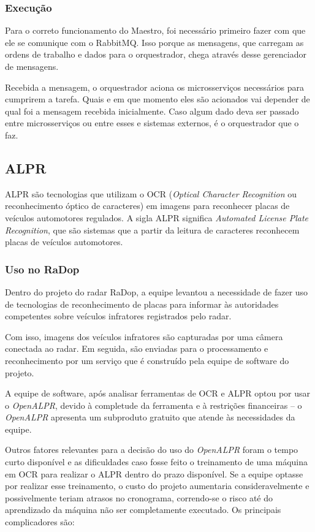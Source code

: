 \subsubsection{Execução}
Para o correto funcionamento do Maestro, foi necessário primeiro fazer com que ele se comunique com o RabbitMQ. Isso porque as mensagens, que carregam as ordens de trabalho e dados para o orquestrador, chega através desse gerenciador de mensagens.

Recebida a mensagem, o orquestrador aciona os microsserviços necessários para cumprirem a tarefa. Quais e em que momento eles são acionados vai depender de qual foi a mensagem recebida inicialmente. Caso algum dado deva ser passado entre microsserviços ou entre esses e sistemas externos, é o orquestrador que o faz.

\subsection{ALPR}

ALPR são tecnologias que utilizam o OCR (\textit{Optical Character Recognition} ou reconhecimento óptico de caracteres) em imagens para reconhecer placas de veículos automotores regulados. A sigla ALPR significa \textit{Automated License Plate Recognition}, que são sistemas que a partir da leitura de caracteres reconhecem placas de veículos automotores.

\subsubsection{Uso no RaDop}

Dentro do projeto do radar RaDop, a equipe levantou a necessidade de fazer uso de tecnologias de reconhecimento de placas para informar às autoridades competentes sobre veículos infratores registrados pelo radar.

Com isso, imagens dos veículos infratores são capturadas por uma câmera conectada ao radar. Em seguida, são enviadas para o processamento e reconhecimento por um serviço que é construído pela equipe de software do projeto.

A equipe de software, após analisar ferramentas de OCR e ALPR optou por usar o \textit{OpenALPR}, devido à completude da ferramenta e à restrições financeiras -- o \textit{OpenALPR} apresenta um subproduto gratuito que atende às necessidades da equipe.

Outros fatores relevantes para a decisão do uso do \textit{OpenALPR} foram o tempo curto disponível e as dificuldades caso fosse feito o treinamento de uma máquina em OCR para realizar o ALPR dentro do prazo disponível. Se a equipe optasse por realizar esse treinamento, o custo do projeto aumentaria consideravelmente e possivelmente teriam atrasos no cronograma, correndo-se o risco até do aprendizado da máquina não ser completamente executado. Os principais complicadores são:

